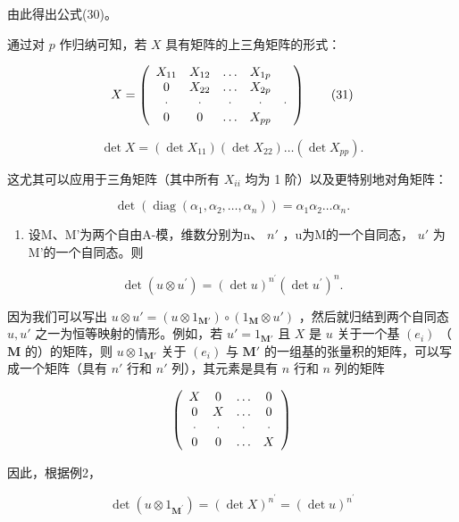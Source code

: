 由此得出公式(30)。

通过对 \(p\) 作归纳可知，若 \(X\) 具有矩阵的上三角矩阵的形式：

\[
X = \left( \begin{array}{c c c c c} X _ {1 1} & X _ {1 2} & \ldots & X _ {1 p} \\ 0 & X _ {2 2} & \ldots & X _ {2 p} \\ \cdot & \cdot & \cdot & \cdot & \cdot \\ 0 & 0 & \ldots & X _ {p p} \end{array} \right)\tag{31}
\]

\[
\det X = (\det X _ {1 1}) (\det X _ {2 2}) \dots (\det X _ {p p}).
\]

这尤其可以应用于三角矩阵（其中所有 \(X_{ii}\) 均为 1 阶）以及更特别地对角矩阵：

\[
\det (\operatorname{diag} \left(\alpha_ {1}, \alpha_ {2}, \dots , \alpha_ {n}\right)) = \alpha_ {1} \alpha_ {2} \dots \alpha_ {n}.\tag{32}
\]

\begin{enumerate}
\def\labelenumi{(\arabic{enumi})}
\setcounter{enumi}{2}
\tightlist
\item
  设M、M'为两个自由A-模，维数分别为n、 \(n'\) ，u为M的一个自同态， \(u'\) 为M'的一个自同态。则
\end{enumerate}

\[
\det (u \otimes u ^ {\prime}) = (\det u) ^ {n ^ {\prime}} (\det u ^ {\prime}) ^ {n}.\tag{33}
\]

因为我们可以写出 \(u \otimes u' = (u \otimes 1_{\mathbf{M}'}) \circ (1_{\mathbf{M}} \otimes u')\) ，然后就归结到两个自同态 \(u, u'\) 之一为恒等映射的情形。例如，若 \(u' = 1_{\mathbf{M}'}\) 且 \(X\) 是 \(u\) 关于一个基 \((e_i)\) （ \(\mathbf{M}\) 的）的矩阵，则 \(u \otimes 1_{\mathbf{M}'}\) 关于 \((e_i)\) 与 \(\mathbf{M}'\) 的一组基的张量积的矩阵，可以写成一个矩阵（具有 \(n'\) 行和 \(n'\) 列），其元素是具有 \(n\) 行和 \(n\) 列的矩阵

\[
\left( \begin{array}{c c c c} X & 0 & \ldots & 0 \\ 0 & X & \ldots & 0 \\ \cdot & \cdot & \cdot & \cdot \\ 0 & 0 & \ldots & X \end{array} \right)
\]

因此，根据例2，

\[
\det (u \otimes 1 _ {\mathbf {M} ^ {\prime}}) = (\det X) ^ {n ^ {\prime}} = (\det u) ^ {n ^ {\prime}}
\]


